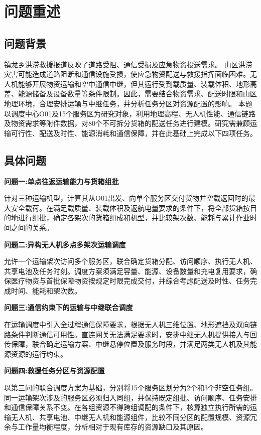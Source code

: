 \documentclass[bwprint]{gmcmthesis}
\begin{document}
\pagestyle{plain}

\maketoc

\clearpage

\section{问题重述}
\subsection{问题背景}
镇龙乡洪涝救援报道反映了道路受阻、通信受损及应急物资投送需求\cite{xinhua2026,daily2026}。
山区洪涝灾害可能造成道路阻断和通信设施受损，使应急物资配送与救援指挥面临困难。无人机能够开展物资运输和空中通信中继，但其运行受到载质量、装载体积、地形高差、能源储备及设备数量等条件限制。因此，需要结合物资需求、配送时限和山区地理环境，合理安排运输与中继任务，并分析任务分区对资源配置的影响。
本题以调度中心O01及15个服务区为研究对象，利用地理高程、无人机性能、通信链路及物资需求等附件数据，对80个不可拆分货箱的配送任务进行建模。研究需兼顾运输可行性、配送及时性、能源消耗和通信保障，并在此基础上完成以下四项任务。
\subsection{具体问题}
\textbf{问题一:单点往返运输能力与货箱组批}

针对三种运输机型，计算其从O01出发、向单个服务区交付货物并空载返回时的最大安全载荷。在满足载质量、装载体积及返航电量要求的条件下，将全部货箱按目的地进行组批，确定各架次的货箱组成和机型，并比较架次数、能耗与累计作业时间之间的关系。

\textbf{问题二:异构无人机多点多架次运输调度}

允许一个运输架次访问多个服务区，联合确定货箱分配、访问顺序、执行无人机、共享电池及任务时刻。调度方案须满足容量、能源、设备数量和充电复用要求，确保医疗物资与首批保障物资按规定时限完成交付，并综合考虑配送及时性、任务完成时间、能耗和架次数。

\textbf{问题三:通信约束下的运输与中继联合调度}

在运输调度中引入全过程通信保障要求，根据无人机三维位置、地形遮挡及双向链路条件判断通信可用性。直连网关无法满足要求时，安排中继无人机提供接入与回传保障，联合确定运输方案、中继悬停位置及服务时段，并满足两类无人机及其能源资源的运行约束。

\textbf{问题四:救援任务分区与资源配置}

以第三问的联合调度方案为基础，分别将15个服务区划分为2个和3个非空任务组。同一运输架次涉及的服务区必须归入同组，并保持既定组批、访问顺序、任务安排和通信保障关系不变。在各组资源不得跨组调配的条件下，核算独立执行所需的运输无人机、共享电池、中继无人机和能源组件，比较不同分区的配置规模、资源冗余与工作量均衡程度，分析相对于现有库存的资源缺口及其原因。
\clearpage
\end{document}
